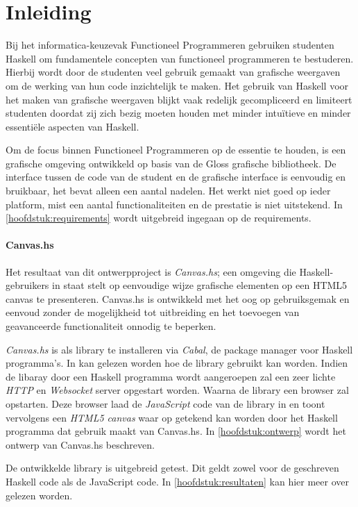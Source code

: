 \chapter{Inleiding}
Bij het informatica-keuzevak Functioneel Programmeren gebruiken studenten Haskell om fundamentele concepten van functioneel programmeren te bestuderen. Hierbij wordt door de studenten veel gebruik gemaakt van grafische weergaven om de werking van hun code inzichtelijk te maken. Het gebruik van Haskell voor het maken van grafische weergaven blijkt vaak redelijk gecompliceerd en limiteert studenten doordat zij zich bezig moeten houden met minder intuïtieve en minder essentiële aspecten van Haskell.

Om de focus binnen Functioneel Programmeren op de essentie te houden, is een grafische omgeving ontwikkeld op basis van de Gloss grafische bibliotheek. De interface tussen de code van de student en de grafische interface is eenvoudig en bruikbaar, het bevat alleen een aantal nadelen. Het werkt niet goed op ieder platform, mist een aantal functionaliteiten en de prestatie is niet uitstekend. In \autoref{hoofdstuk:requirements} wordt uitgebreid ingegaan op de requirements.

\subsubsection{Canvas.hs}
Het resultaat van dit ontwerpproject is \emph{Canvas.hs}; een omgeving die Haskell-gebruikers in staat stelt op eenvoudige wijze grafische elementen op een HTML5 canvas te presenteren. Canvas.hs is ontwikkeld met het oog op gebruiksgemak en eenvoud zonder de mogelijkheid tot uitbreiding en het toevoegen van geavanceerde functionaliteit onnodig te beperken.

\emph{Canvas.hs} is als library te installeren via \emph{Cabal}, de package manager voor Haskell programma's. In  kan gelezen worden hoe de library gebruikt kan worden. Indien de libaray door een Haskell programma wordt aangeroepen zal een zeer lichte \emph{HTTP} en \emph{Websocket} server opgestart worden. Waarna de library een browser zal opstarten. Deze browser laad de \emph{JavaScript} code van de library in en toont vervolgens een \emph{HTML5 canvas} waar op getekend kan worden door het Haskell programma dat gebruik maakt van Canvas.hs. In \autoref{hoofdstuk:ontwerp} wordt het ontwerp van Canvas.hs beschreven.

De ontwikkelde library is uitgebreid getest. Dit geldt zowel voor de geschreven Haskell code als de JavaScript code. In \autoref{hoofdstuk:resultaten} kan hier meer over gelezen worden.

